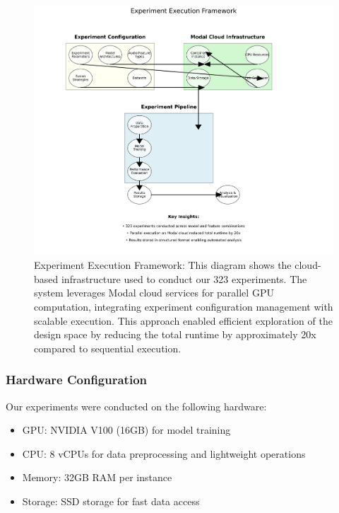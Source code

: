 \documentclass[12pt]{article}
\begin{document}
\begin{figure}[h]
    \centering
    \includegraphics[width=0.9\linewidth]{Figures/experiment_framework.png}
    \caption{Experiment Execution Framework: This diagram shows the cloud-based infrastructure used to conduct our 323 experiments. The system leverages Modal cloud services for parallel GPU computation, integrating experiment configuration management with scalable execution. This approach enabled efficient exploration of the design space by reducing the total runtime by approximately 20x compared to sequential execution.}
    \label{fig:experiment_framework}
\end{figure}

\subsubsection{Hardware Configuration}
Our experiments were conducted on the following hardware:
\begin{itemize}
    \item GPU: NVIDIA V100 (16GB) for model training
    \item CPU: 8 vCPUs for data preprocessing and lightweight operations
    \item Memory: 32GB RAM per instance
    \item Storage: SSD storage for fast data access
\end{itemize}
\end{document}
